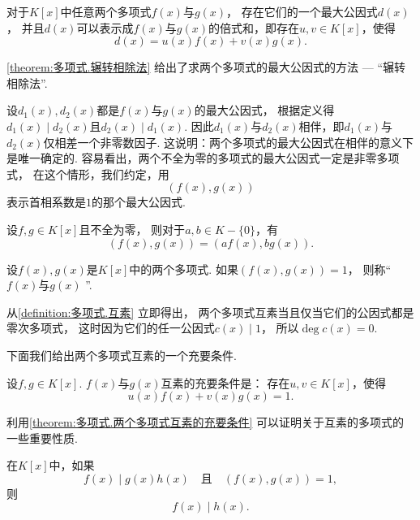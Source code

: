 \begin{theorem}\label{theorem:多项式.辗转相除法}
对于\(K[x]\)中任意两个多项式\(f(x)\)与\(g(x)\)，
存在它们的一个最大公因式\(d(x)\)，
并且\(d(x)\)可以表示成\(f(x)\)与\(g(x)\)的倍式和，即存在\(u,v \in K[x]\)，使得\[
	d(x) = u(x) f(x) + v(x) g(x).
\]
\end{theorem}

\cref{theorem:多项式.辗转相除法} 给出了求两个多项式的最大公因式的方法 --- “辗转相除法”.

设\(d_1(x),d_2(x)\)都是\(f(x)\)与\(g(x)\)的最大公因式，
根据定义得\(d_1(x) \mid d_2(x)\)且\(d_2(x) \mid d_1(x)\).
因此\(d_1(x)\)与\(d_2(x)\)相伴，即\(d_1(x)\)与\(d_2(x)\)仅相差一个非零数因子.
这说明：两个多项式的最大公因式在相伴的意义下是唯一确定的.
容易看出，两个不全为零的多项式的最大公因式一定是非零多项式，
在这个情形，我们约定，用\[
	(f(x), g(x))
\]表示首相系数是\(1\)的那个最大公因式.

\begin{proposition}
设\(f,g \in K[x]\)且不全为零，
则对于\(a,b \in K-\{0\}\)，有\[
	(f(x), g(x)) = (a f(x), b g(x)).
\]
\end{proposition}

\begin{definition}\label{definition:多项式.互素}
设\(f(x),g(x)\)是\(K[x]\)中的两个多项式.
如果\((f(x),g(x))=1\)，
则称“\(f(x)\)与\(g(x)\) ”.
\end{definition}

从\cref{definition:多项式.互素} 立即得出，
两个多项式互素当且仅当它们的公因式都是零次多项式，
这时因为它们的任一公因式\(c(x) \mid 1\)，
所以\(\deg c(x) = 0\).

下面我们给出两个多项式互素的一个充要条件.
\begin{theorem}\label{theorem:多项式.两个多项式互素的充要条件}
设\(f,g \in K[x]\).
\(f(x)\)与\(g(x)\)互素的充要条件是：
存在\(u,v \in K[x]\)，使得\[
	u(x) f(x) + v(x) g(x) = 1.
\]
\end{theorem}

利用\cref{theorem:多项式.两个多项式互素的充要条件} 可以证明关于互素的多项式的一些重要性质.

\begin{property}
在\(K[x]\)中，如果\[
	f(x) \mid g(x) h(x)
	\quad\text{且}\quad
	(f(x),g(x))=1,
\]
则\[
	f(x) \mid h(x).
\]
\end{property}

